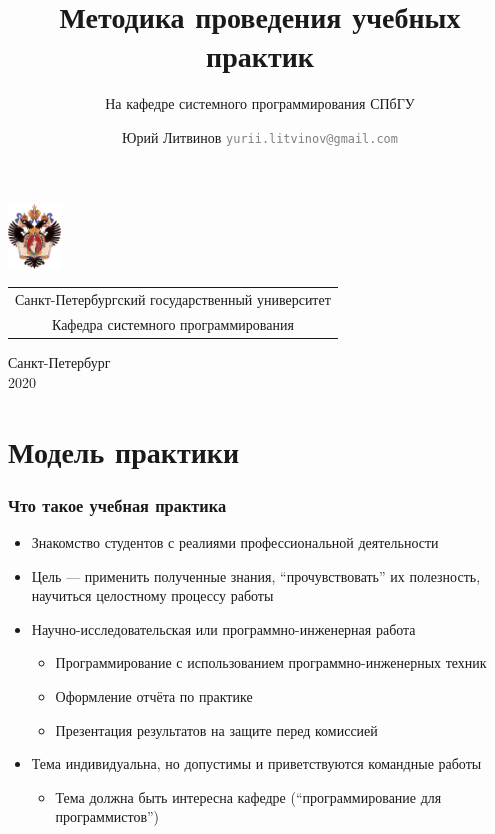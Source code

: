 \documentclass[xetex,mathserif,serif]{beamer}
\title{Методика проведения учебных практик}
\subtitle{На кафедре системного программирования СПбГУ}
\author[Юрий Литвинов]{Юрий Литвинов \newline \textcolor{gray}{\small\texttt{yurii.litvinov@gmail.com}}}
\date{}
\begin{document}
{
\begin{frame}
  \includegraphics[width=1.4cm]{pictures/SPbGU_Logo.png}
\vspace{-35pt}
\hspace{-10pt}
\begin{center}
   \begin{tabular}{c}
        \scriptsize{Санкт-Петербургский государственный университет} \\
        \scriptsize{Кафедра системного программирования}
    \end{tabular}
\titlepage
\end{center}

\btVFill

\begin{center}
  \vspace{5pt}
  \scriptsize{Санкт-Петербург\\
                 2020}
  \end{center}

\end{frame}
}

    \section{Модель практики}

    \begin{frame}
        \frametitle{Что такое учебная практика}
        \begin{itemize}
            \item Знакомство студентов с реалиями профессиональной деятельности
            \item Цель --- применить полученные знания, ``прочувствовать'' их полезность, научиться целостному процессу работы
            \item Научно-исследовательская или программно-инженерная работа%
            \begin{itemize}
                \item Программирование с использованием программно-инженерных техник
                \item Оформление отчёта по практике
                \item Презентация результатов на защите перед комиссией
            \end{itemize}
            \item Тема индивидуальна, но допустимы и приветствуются командные работы
            \begin{itemize}
                \item Тема должна быть интересна кафедре (``программирование для программистов'')
            \end{itemize}
        \end{itemize}
    \end{frame}
\end{document}
